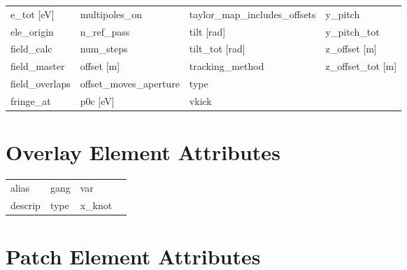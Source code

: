 \begin{tabular}{llll}
e_tot [eV]                     & multipoles_on                  & taylor_map_includes_offsets    & y_pitch                        \\
ele_origin                     & n_ref_pass                     & tilt [rad]                     & y_pitch_tot                    \\
field_calc                     & num_steps                      & tilt_tot [rad]                 & z_offset [m]                   \\
field_master                   & offset [m]                     & tracking_method                & z_offset_tot [m]               \\
field_overlaps                 & offset_moves_aperture          & type                           &                                \\
fringe_at                      & p0c [eV]                       & vkick                          &                                \\
 \bottomrule
 \end{tabular}
 \vfill
 
 \section{Overlay Element Attributes}
 \label{s:list.overlay}
 
 \begin{tabular}{llll} \toprule
alias                          & gang                           & var                            &                                \\
descrip                        & type                           & x_knot                         &                                \\
 \bottomrule
 \end{tabular}
 \vfill
 
 \section{Patch Element Attributes}
 \label{s:list.patch}
 
